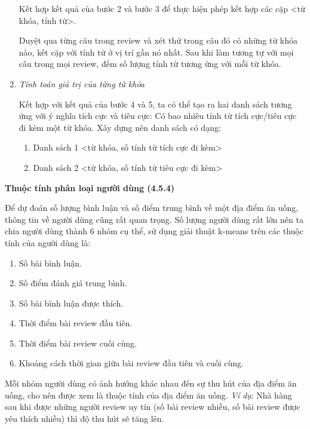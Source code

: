 \documentclass[12pt]{extarticle}
\begin{document}
\begin{enumerate}
						\par Kết hợp kết quả của bước 2 và bước 3 để thực hiện phép kết hợp các cặp <từ khóa, tính từ>. 	
						\par Duyệt qua từng câu trong review và xét thử trong câu đó có những từ khóa nào, kết cặp với tính từ ở vị trí gần nó nhất. Sau khi làm tương tự với mọi câu trong mọi review, đếm số lượng tính từ tương ứng với mỗi từ khóa.
					\item \textit{Tính toán giá trị của từng từ khóa}
						\par Kết hợp với kết quả của bước 4 và 5, ta có thể tạo ra hai danh sách tương ứng với ý nghĩa tích cực và tiêu cực: Có bao nhiêu tính từ tích cực/tiêu cực đi kèm một từ khóa. Xây dựng nên danh sách có dạng:
						\begin{enumerate}
							\item Danh sách 1 <từ khóa, số tính từ tích cực đi kèm>
							\item Danh sách 2 <từ khóa, số tính từ tiêu cực đi kèm>
						\end{enumerate}
				\end{enumerate}
			\par \textbf{Thuộc tính phân loại người dùng (4.5.4)}
				\par Để dự đoán số lượng bình luận và số điểm trung bình về một địa điểm ăn uống, thông tin về người dùng cũng rất quan trọng. Số lượng người dùng rất lớn nên ta chia người dùng thành 6 nhóm cụ thể, sử dụng giải thuật k-means trên các thuộc tính của người dùng là:
				\begin{enumerate}
					\item Số bài bình luận.
					\item Số điểm đánh giá trung bình.
					\item Số bài bình luận được thích.
					\item Thời điểm bài review đầu tiên.
					\item Thời điểm bài review cuối cùng.
					\item Khoảng cách thời gian giữa bài review đầu tiên và cuối cùng.
				\end{enumerate}
				\par Mỗi nhóm người dùng có ảnh hưởng khác nhau đến sự thu hút của địa điểm ăn uống, cho nên được xem là thuộc tính của địa điểm ăn uống. \textit{Ví dụ}: Nhà hàng sau khi được những người review uy tín (số bài review nhiều, số bài review được yêu thích nhiều) thì độ thu hút sẽ tăng lên.
\end{document}
